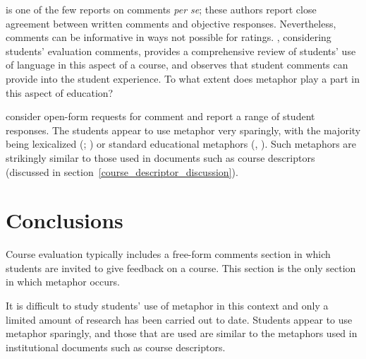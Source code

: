  is one of the few reports on comments \emph{per
  se}; these authors report close agreement between written comments
and objective responses.  Nevertheless, comments can be informative in
ways not possible for ratings.  , considering
students' evaluation comments, provides a comprehensive review of
students' use of language in this aspect of a course, and observes
that student comments can provide  into the
student experience.  To what extent does metaphor play a part in this
aspect of education?

 consider open-form requests for comment and report
a range of student responses.  The students appear to use metaphor
very sparingly, with the majority being lexicalized (; ) or standard educational
metaphors (, ).  Such metaphors are strikingly similar to those used in
documents such as course descriptors (discussed in
section~\ref{course_descriptor_discussion}).

\section{Conclusions}

Course evaluation typically includes a free-form comments section in
which students are invited to give feedback on a course.  This section
is the only section in which metaphor occurs.

It is difficult to study students' use of metaphor in this context and
only a limited amount of research has been carried out to date.
Students appear to use metaphor sparingly, and those that are used are
similar to the metaphors used in institutional documents such as
course descriptors.

